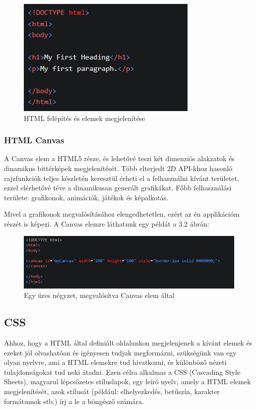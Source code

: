 \begin{figure}[h]
\centering
\includegraphics[scale=0.8]{images/htmlExample.png}
\caption{HTML felépítés és elemek megjelenítése}
\label{fig:htmlExample}
\end{figure}

\pagebreak

\subsubsection{HTML Canvas} 

A Canvas elem a HTML5 része, és lehetővé teszi két dimenziós alakzatok és dinamikus bittérképek megjelenítését. Több elterjedt 2D API-khoz hasonló rajzfunkciók teljes készletén keresztül érheti el a felhasználni kívánt területet, ezzel elérhetővé téve a dinamikusan generált grafikákat. Főbb felhasználási területe: grafikonok, animációk, játékok és képalkotás.

Mivel a grafikonok megvalósításához elengedhetetlen, ezért az én applikációm részét is képezi. A Canvas elemre láthatunk egy példát a 3.2 ábrán:
\begin{figure}[h]
\centering
\includegraphics[scale=0.7]{images/canvasExample.png}
\caption{Egy üres négyzet, megvalósítva Canvas elem által}
\end{figure}

\subsection{CSS}

Ahhoz, hogy a HTML által definiált oldalunkon megjelenjenek a kívánt elemek és ezeket jól olvashatóan és igényesen tudjuk megformázni, szükségünk van egy olyan nyelvre, ami a HTML elemekre tud hivatkozni, és különböző nézeti tulajdonságokat tud neki átadni. Ezen célra alkalmas a CSS  (Cascading Style Sheets), magyarul lépcsőzetes stíluslapok, egy leíró nyelv, amely a HTML elemek megjelenítését, azok stílusát (például: elhelyezkedés, betűszín, karakter formátumok stb.) írj a le a böngésző számára. 

